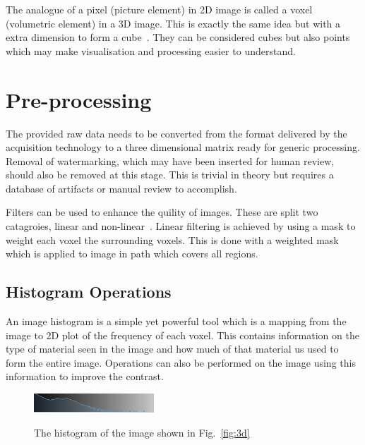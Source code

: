 \documentclass[journal]{IEEEtran}
\begin{document}
The analogue of a pixel (picture element) in 2D image is called a voxel (volumetric element) in a 3D image.
This is exactly the same idea but with a extra dimension to form a cube~\cite{lohmann1998volumetric}.
They can be considered cubes but also points which may make visualisation and processing easier to understand.










\section{Pre-processing}
\label{sec:pre}

The provided raw data needs to be converted from the format delivered by the acquisition technology to a three dimensional matrix ready for generic processing.
Removal of watermarking, which may have been inserted for human review, should also be removed at this stage. 
This is trivial in theory but requires a database of artifacts or manual review to accomplish.

Filters can be used to enhance the quility of images.
These are split two catagroies, linear and non-linear~\cite{lohmann1998volumetric}.
Linear filtering is achieved by using a mask to weight each voxel the surrounding voxels.
This is done with a weighted mask which is applied to image in path which covers all regions.


\subsection{Histogram Operations}

An image histogram is a simple yet powerful tool which is a mapping from the image to 2D plot of the frequency of each voxel.
This contains information on the type of material seen in the image and how much of that material us used to form the entire image.
Operations can also be performed on the image using this information to improve the contrast.

\begin{figure}[!htb]
   \centering
   \includegraphics[width = 0.4\textwidth]{Figures/Histogram.png}
   \label{fig:histogram}
   \caption{The histogram of the image shown in Fig.~\ref{fig:3d}}
\end{figure}
\end{document}
